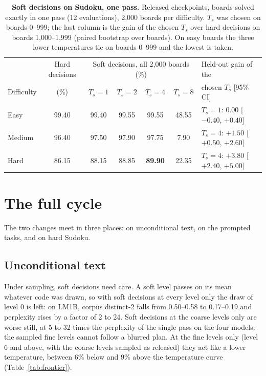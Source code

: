 \documentclass[11pt]{article}
\begin{document}
\begin{table}[t]
\centering
\small
\renewcommand{\arraystretch}{1.12}
\begin{tabular*}{\linewidth}{@{\extracolsep{\fill}}lcccccl@{}}
\toprule
 & Hard decisions & \multicolumn{4}{c}{Soft decisions, all 2,000 boards (\%)} & Held-out gain of the \\
Difficulty & (\%) & $T_s{=}1$ & $T_s{=}2$ & $T_s{=}4$ & $T_s{=}8$ & chosen $T_s$ [95\% CI] \\
\midrule
Easy & 99.40 & 99.40 & 99.55 & 99.55 & 48.55 & $T_s{=}1$: \phantom{$+$}0.00 [$-0.40$, $+0.40$] \\
Medium & 96.40 & 97.50 & 97.90 & 97.75 & \phantom{0}7.90 & $T_s{=}4$: $+1.50$ [$+0.50$, $+2.60$] \\
Hard & 86.15 & 88.15 & 88.85 & \textbf{89.90} & 22.35 & $T_s{=}4$: $\mathbf{+3.80}$ [$+2.40$, $+5.00$] \\
\bottomrule
\end{tabular*}
\caption{\textbf{Soft decisions on Sudoku, one pass.} Released checkpoints, boards solved exactly in one pass (12 evaluations), 2,000 boards per difficulty.
$T_s$ was chosen on boards 0--999; the last column is the gain of the chosen $T_s$ over hard decisions on boards
1,000--1,999 (paired bootstrap over boards). On easy boards the three lower temperatures tie on boards 0--999 and the
lowest is taken.}
\label{tab:sudoku}
\end{table}

\section{The full cycle}
\label{sec:full}

The two changes meet in three places: on unconditional text, on the prompted tasks, and on hard Sudoku.

\subsection{Unconditional text}

Under sampling, soft decisions need care. A soft level passes on its mean whatever code was drawn, so with soft
decisions at every level only the draw of level 0 is left: on LM1B, corpus distinct-2 falls from 0.50--0.58 to
0.17--0.19 and perplexity rises by a factor of 2 to 24. Soft decisions at the coarse levels only are worse still, at 5
to 32 times the perplexity of the single pass on the four models: the sampled fine levels cannot follow a blurred
plan. At the fine levels only (level 6 and above, with the coarse levels sampled as released) they act like a lower
temperature, between 6\% below and 9\% above the temperature curve (Table~\ref{tab:frontier}).
\end{document}
